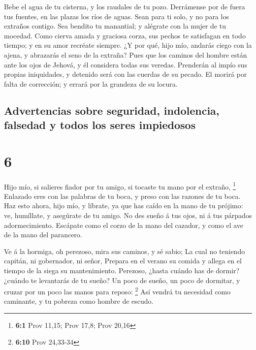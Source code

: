  Bebe el agua de tu cisterna, y los raudales de tu pozo.
 Derrámense por de fuera tus fuentes, en las plazas los
ríos de aguas.  Sean para ti solo, y no para los extraños
contigo.  Sea bendito tu manantial; y alégrate con la mujer
de tu mocedad.  Como cierva amada y graciosa corza, sus
pechos te satisfagan en todo tiempo; y en su amor recréate siempre.
 ¿Y por qué, hijo mío, andarás ciego con la ajena, y
abrazarás el seno de la extraña?  Pues que los caminos del
hombre están ante los ojos de Jehová, y él considera todas sus veredas.
 Prenderán al impío sus propias iniquidades, y detenido
será con las cuerdas de su pecado.  El morirá por falta de
corrección; y errará por la grandeza de su locura.

\hypertarget{advertencias-sobre-seguridad-indolencia-falsedad-y-todos-los-seres-impiedosos}{%
\subsection{Advertencias sobre seguridad, indolencia, falsedad y todos
los seres
impiedosos}\label{advertencias-sobre-seguridad-indolencia-falsedad-y-todos-los-seres-impiedosos}}

\hypertarget{section-5}{%
\section{6}\label{section-5}}

 Hijo mío, si salieres fiador por tu amigo, si tocaste tu
mano por el extraño, \footnote{\textbf{6:1} Prov 11,15; Prov 17,8; Prov
  20,16}  Enlazado eres con las palabras de tu boca, y preso
con las razones de tu boca.  Haz esto ahora, hijo mío, y
líbrate, ya que has caído en la mano de tu prójimo: ve, humíllate, y
asegúrate de tu amigo.  No des sueño á tus ojos, ni á tus
párpados adormecimiento.  Escápate como el corzo de la mano
del cazador, y como el ave de la mano del parancero.

 Ve á la hormiga, oh perezoso, mira sus caminos, y sé sabio;
 La cual no teniendo capitán, ni gobernador, ni señor,
 Prepara en el verano su comida y allega en el tiempo de la
siega su mantenimiento.  Perezoso, ¿hasta cuándo has de
dormir? ¿cuándo te levantarás de tu sueño?  Un poco de
sueño, un poco de dormitar, y cruzar por un poco las manos para reposo:
\footnote{\textbf{6:10} Prov 24,33-34}  Así vendrá tu
necesidad como caminante, y tu pobreza como hombre de escudo.

